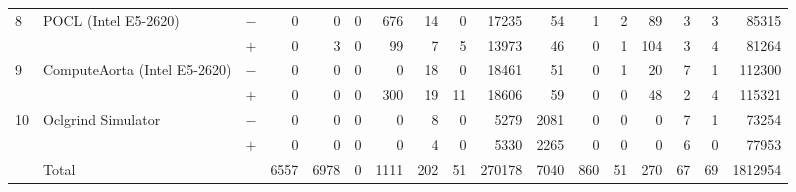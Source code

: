 \begin{tabular}{lll | rrrrrrr | rrrrrrr }
\hline
\multirow{ 2}{*}{8} & \multirow{ 2}{*}{POCL (Intel E5-2620)} & $-$ & 0 & 0 & 0 & 676 & 14 & 0 & 17235       & 54 & 1 & 2 & 89 & 3 & 3 & 85315 \\& & $+$ & 0 & 3 & 0 & 99 & 7 & 5 & 13973 & 46 & 0 & 1 & 104 & 3 & 4 & 81264 \\
\hline
\multirow{ 2}{*}{9} & \multirow{ 2}{*}{ComputeAorta (Intel E5-2620)} & $-$ & 0 & 0 & 0 & 0 & 18 & 0 & 18461       & 51 & 0 & 1 & 20 & 7 & 1 & 112300 \\& & $+$ & 0 & 0 & 0 & 300 & 19 & 11 & 18606 & 59 & 0 & 0 & 48 & 2 & 4 & 115321 \\
\hline
\multirow{ 2}{*}{10} & \multirow{ 2}{*}{Oclgrind Simulator} & $-$ & 0 & 0 & 0 & 0 & 8 & 0 & 5279       & 2081 & 0 & 0 & 0 & 7 & 1 & 73254 \\& & $+$ & 0 & 0 & 0 & 0 & 4 & 0 & 5330 & 2265 & 0 & 0 & 0 & 6 & 0 & 77953 \\
  \midrule
  
\multirow{ 2}{*}{} & \multirow{ 2}{*}{Total} & \multirow{ 2}{*}{} &
\multirow{ 2}{*}{6557} & \multirow{ 2}{*}{6978} & \multirow{ 2}{*}{0} & \multirow{ 2}{*}{1111} & \multirow{ 2}{*}{202} & \multirow{ 2}{*}{51} & \multirow{ 2}{*}{270178} & \multirow{ 2}{*}{7040} & \multirow{ 2}{*}{860} & \multirow{ 2}{*}{51} & \multirow{ 2}{*}{270} & \multirow{ 2}{*}{67} & \multirow{ 2}{*}{69} & \multirow{ 2}{*}{1812954} \\
\\

  \bottomrule
\end{tabular}

